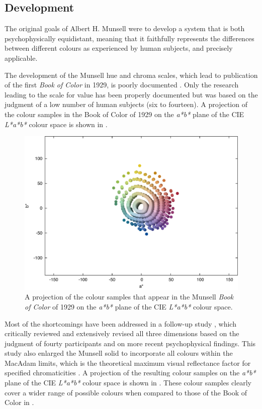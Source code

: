 \subsection{Development}

The original goals of Albert H. Munsell were to develop a system that
is both psychophysically equidistant, meaning that it faithfully
represents the differences between different colours as experienced by
human subjects, and precisely applicable.

The development of the Munsell hue and chroma scales, which lead to
publication of the first \textit{Book of Color} in 1929, is poorly documented
\citep{berns82development}. Only the research leading to the scale for
value has been properly documented but was based on the judgment of a
low number of human subjects (six to fourteen). A projection of the
colour samples in the Book of Color of 1929 on the \emph{a*b*} plane
of the CIE \emph{L*a*b*} colour space is shown in .

\begin{figure}[htbp]
\begin{center}
\includegraphics[width=.8\textwidth]{./spaces/figures/book-of-color-1929.pdf}
\caption[Colour samples of The Munsell Book of Color of 1929]{A projection of the colour samples that appear in the Munsell \textit{Book of Color} of 1929 on the \emph{a*b*} plane of the CIE \emph{L*a*b*} colour space.}
\label{f:book-of-color-1929}
\end{center}
\end{figure}

Most of the shortcomings have been addressed in a follow-up study
\citep{newhall42final}, which critically reviewed and extensively
revised all three dimensions based on the judgment of fourty
participants and on more recent psychophysical findings. This study
also enlarged the Munsell solid to incorporate all colours within the
MacAdam limits, which is the theoretical maximum visual reflectance
factor for specified chromaticities \citep{macadam35maximum}. A
projection of the resulting colour samples on the \emph{a*b*} plane of
the CIE \emph{L*a*b*} colour space is shown in . These colour samples clearly cover a wider range of
possible colours when compared to those of the Book of Color in .

